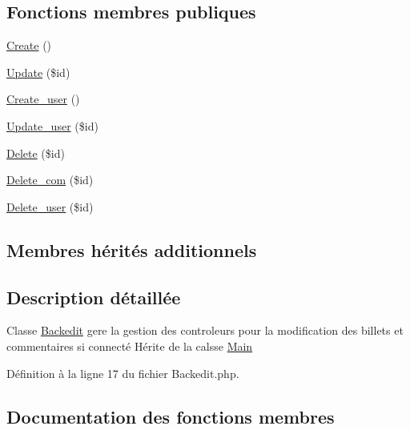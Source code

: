 \subsection*{Fonctions membres publiques}
\begin{DoxyCompactItemize}
\item 
\hyperlink{class_src_1_1_controllers_1_1_backedit_ad01f71fa0ecc039494e3c282864298c3}{Create} ()
\item 
\hyperlink{class_src_1_1_controllers_1_1_backedit_a82232b33fbfacdbdb8a8f49acaecf564}{Update} (\$id)
\item 
\hyperlink{class_src_1_1_controllers_1_1_backedit_af3369c06390987c5f54b6bc444c615ee}{Create\+\_\+user} ()
\item 
\hyperlink{class_src_1_1_controllers_1_1_backedit_ac76a9db7f422d94f155c99c21540da0e}{Update\+\_\+user} (\$id)
\item 
\hyperlink{class_src_1_1_controllers_1_1_backedit_a59113b5ecd1d155db6a4f30af34a1e80}{Delete} (\$id)
\item 
\hyperlink{class_src_1_1_controllers_1_1_backedit_a38147e014898a3417c74b23e903621b0}{Delete\+\_\+com} (\$id)
\item 
\hyperlink{class_src_1_1_controllers_1_1_backedit_ac8f9af14ff73b939d55940eb2ff886ee}{Delete\+\_\+user} (\$id)
\end{DoxyCompactItemize}
\subsection*{Membres hérités additionnels}


\subsection{Description détaillée}
Classe \hyperlink{class_src_1_1_controllers_1_1_backedit}{Backedit} gere la gestion des controleurs pour la modification des billets et commentaires si connecté Hérite de la calsse \hyperlink{class_src_1_1_controllers_1_1_main}{Main} 

Définition à la ligne 17 du fichier Backedit.\+php.



\subsection{Documentation des fonctions membres}
\mbox{\label{class_src_1_1_controllers_1_1_backedit_ad01f71fa0ecc039494e3c282864298c3}} 
